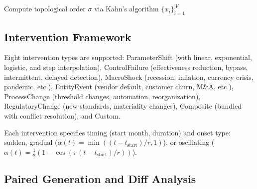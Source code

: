 \begin{algorithm}[t]
\caption{Causal forward propagation with lag awareness.}
\label{alg:propagation}
\BlankLine
Compute topological order $\sigma$ via Kahn's algorithm\;
\Return $\{x_i\}_{i=1}^{|V|}$\;
\end{algorithm}

\subsection{Intervention Framework}
\label{sec:cf_interventions}

Eight intervention types are supported: ParameterShift (with linear,
exponential, logistic, and step interpolation), ControlFailure
(effectiveness reduction, bypass, intermittent, delayed detection),
MacroShock (recession, inflation, currency crisis, pandemic, etc.),
EntityEvent (vendor default, customer churn, M\&A, etc.),
ProcessChange (threshold changes, automation, reorganization),
RegulatoryChange (new standards, materiality changes),
Composite (bundled with conflict resolution), and Custom.

Each intervention specifies timing (start month, duration) and onset
type: sudden, gradual ($\alpha(t) = \min((t - t_{\text{start}})/r, 1)$),
or oscillating ($\alpha(t) = \tfrac{1}{2}(1 - \cos(\pi(t - t_{\text{start}})/r))$).

\subsection{Paired Generation and Diff Analysis}
\label{sec:cf_paired}

